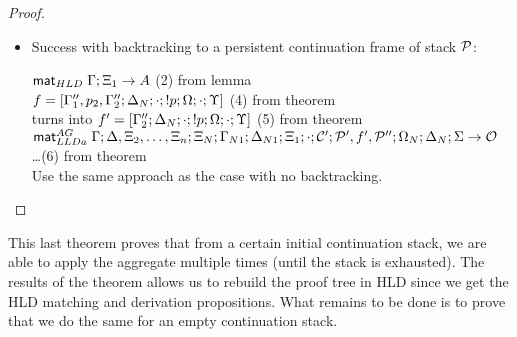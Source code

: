 \begin{proof}
\begin{itemize}[leftmargin=*]
   \item Success with backtracking to a persistent continuation frame of stack
   $\mathcal{P}$:

      $\mathsf{mat}_{HLD} \; \Gamma; \Xi_1 \rightarrow A$ \hfill (2) from lemma \\

      $f = [\Gamma''_1, p_2, \Gamma''_2; \Delta_N; \cdot; {!} p; \Omega; \cdot; \Upsilon]$ \hfill (4) from theorem \\
      turns into $f' = [\Gamma''_2; \Delta_N; \cdot; {!} p; \Omega; \cdot;
      \Upsilon]$ \hfill (5) from theorem \\

      $\mathsf{mat}_{LLDa}^{AG} \; \Gamma; \Delta, \Xi_2, \dotsc, \Xi_n; \Xi_N; \Gamma_{N1};
         \Delta_{N1}; \Xi_1; \cdot; \mathcal{C'}; \mathcal{P'}, f', \mathcal{P''};
         \Omega_N; \Delta_N; \Sigma \rightarrow
         \mathcal{O}$ \\ \dots \hfill (6) from theorem \\
         
      Use the same approach as the case with no backtracking.
      
\end{itemize}
\end{proof}




This last theorem proves that from a certain initial continuation stack, we are
able to apply the aggregate multiple times (until the stack is exhausted). The
results of the theorem allows us to rebuild the proof tree in HLD since we get
the HLD matching and derivation propositions. What remains to be done is to
prove that we do the same for an empty continuation stack.

